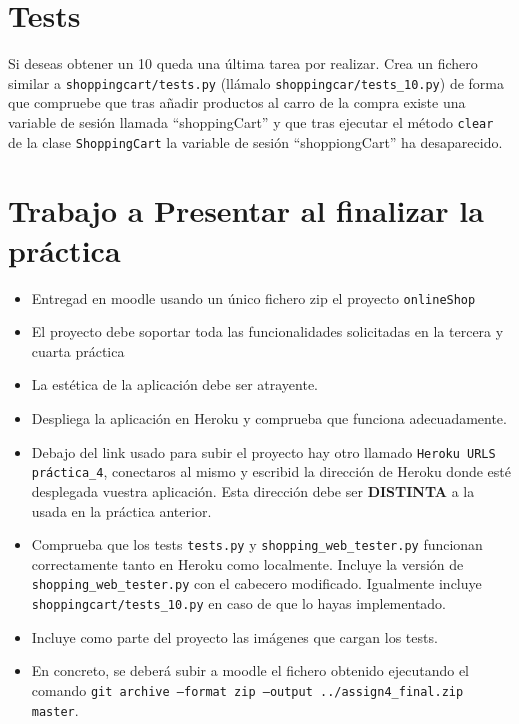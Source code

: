 \documentclass[12pt]{article} %
\newcounter{ejercicioNo}
\newcommand{\ttt}[1]{\texttt{#1}}%
\begin{document}
\section{Tests}
Si deseas obtener un 10 queda una última tarea por realizar. Crea un fichero similar a \ttt{shoppingcart/tests.py} (llámalo \ttt{shoppingcar/tests\_10.py}) de forma que compruebe que tras añadir productos al carro de la compra existe una variable de sesión llamada ``shoppingCart'' y que tras ejecutar el método \ttt{clear} de la clase \ttt{ShoppingCart}
la variable de sesión ``shoppiongCart'' ha desaparecido.

\section{Trabajo a Presentar al finalizar la práctica} %

\begin{minipage}{\linewidth}
\begin{framed}
\addtocounter{ejercicioNo}{1} 
\begin{itemize}

 \item Entregad en moodle usando un único fichero zip el proyecto \ttt{onlineShop}
 \item El proyecto debe soportar toda las funcionalidades solicitadas en la tercera y cuarta práctica 
 \item La estética de la aplicación debe ser atrayente.
 \item Despliega la aplicación en Heroku y comprueba que funciona adecuadamente. 
 \item Debajo del link usado para subir el proyecto hay otro llamado \texttt{Heroku URLS práctica\_4}, conectaros al mismo y escribid la dirección de Heroku donde esté desplegada vuestra aplicación. Esta dirección debe ser \textbf{DISTINTA} a la usada en la práctica anterior.

 \item Comprueba que los tests \ttt{tests.py} y \ttt{shopping\_web\_tester.py} funcionan correctamente tanto en Heroku como localmente. Incluye la versión de  \ttt{shopping\_web\_tester.py} con el cabecero modificado. Igualmente incluye  \ttt{shoppingcart/tests\_10.py} en caso de que lo hayas implementado.
 \item Incluye como parte del proyecto las imágenes que cargan los tests.  
 \item En concreto, se deberá subir a moodle el fichero obtenido ejecutando el comando \texttt{git archive --format zip --output ../assign4\_final.zip  master}.
\end{itemize}


\end{framed}
\end{minipage}
\end{document}
